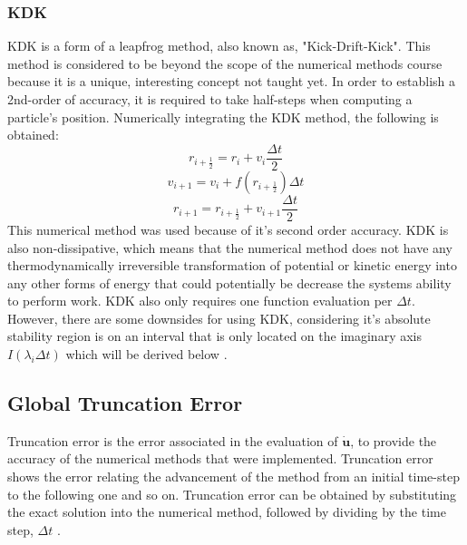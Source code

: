 \documentclass[conf]{new-aiaa}
\begin{document}
        \subsubsection{KDK}
        KDK is a form of a leapfrog method, also known as, "Kick-Drift-Kick"\cite{NumMeth}. This method is considered to be beyond the scope of the numerical methods course because it is a unique, interesting concept not taught yet. In order to establish a 2nd-order of accuracy, it is required to take half-steps when computing a particle's position. Numerically integrating the KDK method, the following is obtained\cite{StabLF}: 
        \begin{equation}
            r_{i+\frac{1}{2}} = r_{i} + v_{i}\frac{\Delta t}{2} 
        \end{equation}
        \begin{equation}
            v_{i+1} = v_{i} + f(r_{i+\frac{1}{2}})\Delta t
        \end{equation}
        \begin{equation}
            r_{i+1} = r_{i+\frac{1}{2}} + v_{i+1}\frac{\Delta t}{2} 
        \end{equation}
        This numerical method was used because of it's second order accuracy. KDK is also non-dissipative, which means that the numerical method does not have any thermodynamically irreversible transformation of potential or kinetic energy into any other forms of energy that could potentially be decrease the systems ability to perform work. KDK also only requires one function evaluation per $\Delta t$. However, there are some downsides for using KDK, considering it's absolute stability region is on an interval that is only located on the imaginary axis $I(\lambda_{i} \Delta t)$ which will be derived below \cite{LeapFTI}.
    \subsection{Global Truncation Error}
    Truncation error is the error associated in the evaluation of $\bm{\dot{u}}$, to provide the accuracy of the numerical methods that were implemented. Truncation error shows the error relating the advancement of the method from an initial time-step to the following one and so on. Truncation error can be obtained by substituting the exact solution into the numerical method, followed by dividing by the time step, $\Delta t$ \cite{LecER}.
\end{document}
